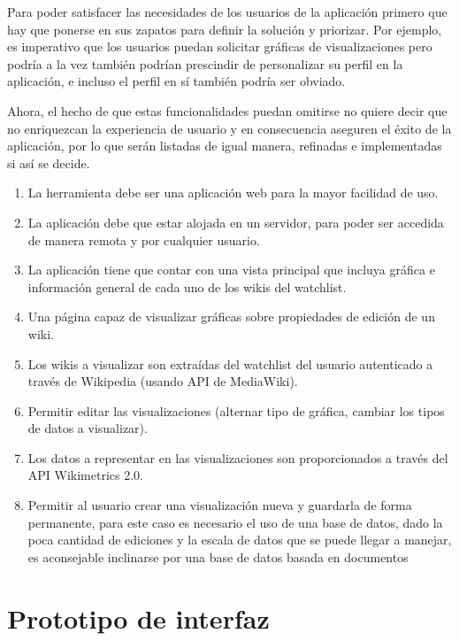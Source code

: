     Para poder satisfacer las necesidades de los usuarios de la aplicación primero que hay que ponerse en sus zapatos para definir la solución y priorizar. Por ejemplo, es imperativo que los usuarios puedan solicitar gráficas de visualizaciones pero podría a la vez también podrían prescindir de personalizar su perfil en la aplicación, e incluso el perfil en sí también podría ser obviado.

    Ahora, el hecho de que estas funcionalidades puedan omitirse no quiere decir que no enriquezcan la experiencia de usuario y en consecuencia aseguren el éxito de la aplicación, por lo que serán listadas de igual manera, refinadas e implementadas si así se decide.


\begin{enumerate}
    \item{La herramienta debe ser una aplicación web para la mayor facilidad de uso.}
    \item{La aplicación debe que estar alojada en un servidor, para poder ser accedida de manera remota y por cualquier usuario.}
    \item{La aplicación tiene que contar con una vista principal que incluya gráfica e información general de cada uno de los wikis del watchlist.}
    \item{Una página capaz de visualizar gráficas sobre propiedades de edición de un wiki.}
    \item{Los wikis a visualizar son extraídas del watchlist del usuario autenticado a través de Wikipedia (usando API de MediaWiki).}
    \item{Permitir editar las visualizaciones (alternar tipo de gráfica, cambiar los tipos de datos a visualizar).}
    \item{Los datos a representar en las visualizaciones son proporcionados a través del API Wikimetrics 2.0.}
    \item{Permitir al usuario crear una visualización nueva y guardarla de forma permanente, para este caso es necesario el uso de una base de datos, dado la poca cantidad de ediciones y la escala de datos que se puede llegar a manejar, es aconsejable inclinarse por una base de datos basada en  documentos}
\end{enumerate}

\section{Prototipo de interfaz}

